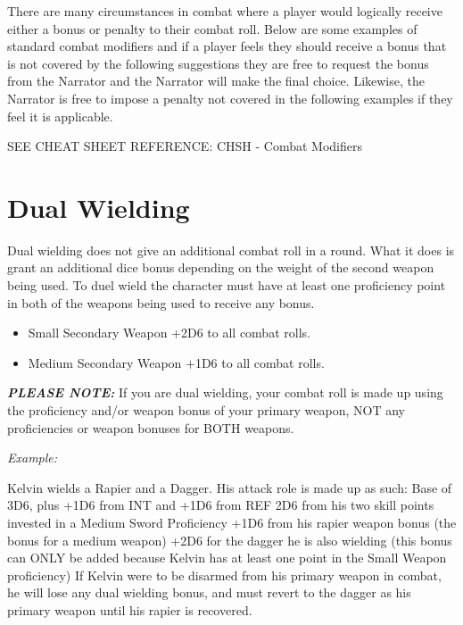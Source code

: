 There are many circumstances in combat where a player would logically receive either a bonus or penalty to their combat roll. Below are some examples of standard combat modifiers and if a player feels they should receive a bonus that is not covered by the following suggestions they are free to request the bonus from the Narrator and the Narrator will make the final choice. Likewise, the Narrator is free to impose a penalty not covered in the following examples if they feel it is applicable.

SEE CHEAT SHEET REFERENCE: CHSH - Combat Modifiers

\section{Dual Wielding} \label{sec:dual_wielding}

Dual wielding does not give an additional combat roll in a round. What it does is grant an additional dice bonus depending on the weight of the second weapon being used. To duel wield the character must have at least one proficiency point in both of the weapons being used to receive any bonus.

\begin{itemize}
    \item Small Secondary Weapon \newline +2D6 to all combat rolls.
    \item Medium Secondary Weapon \newline +1D6 to all combat rolls.
\end{itemize}

\textbf{\textit{PLEASE NOTE:}} If you are dual wielding, your combat roll is made up using the proficiency and/or weapon bonus of your primary weapon, NOT any proficiencies or weapon bonuses for BOTH weapons.

\textit{Example:}

\begin{displayquote}
    Kelvin wields a Rapier and a Dagger. His attack role is made up as such:
    Base of 3D6, plus +1D6 from INT and +1D6 from REF
    2D6 from his two skill points invested in a Medium Sword Proficiency
    +1D6 from his rapier weapon bonus (the bonus for a medium weapon)
    +2D6 for the dagger he is also wielding (this bonus can ONLY be added because Kelvin has at least one point in the Small Weapon proficiency)
    If Kelvin were to be disarmed from his primary weapon in combat, he will lose any dual wielding bonus, and must revert to the dagger as his primary weapon until his rapier is recovered.
\end{displayquote}

